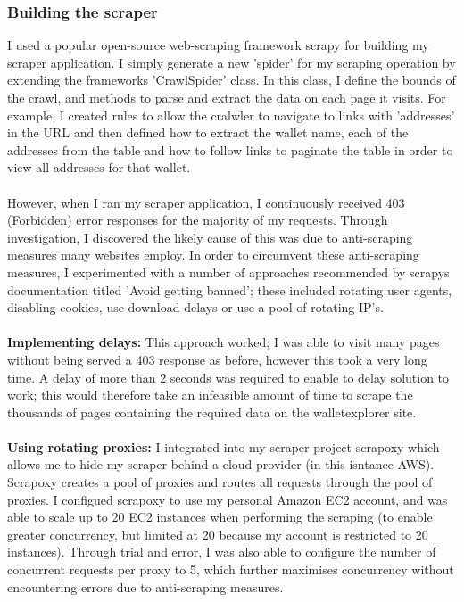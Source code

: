 \subsubsection{Building the scraper}
I used a popular open-source web-scraping framework scrapy for building my scraper application. I simply generate a new 'spider' for my scraping operation by extending the frameworks 'CrawlSpider' class. In this class, I define the bounds of the crawl, and methods to parse and extract the data on each page it visits. For example, I created rules to allow the cralwler to navigate to links with 'addresses' in the URL and then defined how to extract the wallet name,  each of the addresses from the table and how to follow links to paginate the table in order to view all addresses for that wallet. 
\\\\
However, when I ran my scraper application, I continuously received 403 (Forbidden) error responses for the majority of my requests.  Through investigation, I discovered the likely cause of this was due to anti-scraping measures many websites employ. In order to circumvent these anti-scraping measures, I experimented with a number of approaches recommended by scrapys documentation titled 'Avoid getting banned'; these included rotating user agents, disabling cookies, use download delays or use a pool of rotating IP's. 
\\\\
\textbf{Implementing delays:} This approach worked; I was able to visit many pages without being served a 403 response as before, however this took a very long time. A delay of more than 2 seconds was required to enable to delay solution to work; this would therefore take an infeasible amount of time to scrape the thousands of pages containing the required data on the walletexplorer site. 
\\\\
\textbf{Using rotating proxies:} I integrated into my scraper project scrapoxy which allows me to hide my scraper behind a cloud provider (in this isntance AWS). Scrapoxy creates a pool of proxies and routes all requests through the pool of proxies. I configued scrapoxy to use my personal Amazon EC2 account, and was able to scale up to 20 EC2 instances when performing the scraping (to enable greater concurrency, but limited at 20 because my account is restricted to 20 instances).  Through trial and error, I was also able to configure the number of concurrent requests per proxy to 5, which further maximises concurrency without encountering errors due to anti-scraping measures. 

